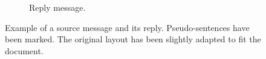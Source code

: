 \begin{figure}
{{\begin{subfigure}[b]{0.9\textwidth}
                \caption{Reply message.}
                \label{fig:exampleReply}
        \end{subfigure}
}}



        \caption{Example of a source message and its reply. Pseudo-sentences have been marked. The original layout has been slightly adapted to fit the document.}\label{fig:exampleSourCeReplyMessage}

\end{figure}



